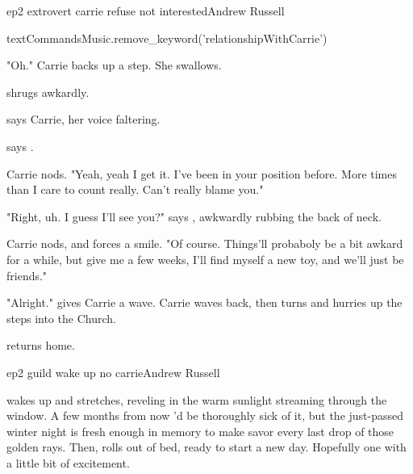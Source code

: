 \documentclass{book}
\begin{document}
\begin{childnode}{ep2 extrovert carrie refuse not interested}{Andrew Russell}


    \begin{code}

        textCommandsMusic.remove_keyword('relationshipWithCarrie')

    \end{code}

    "Oh." Carrie backs up a step. She swallows.
    
    \name{} shrugs awkardly.

     says Carrie, her voice faltering.

     says \name{}.

    Carrie nods. "Yeah, yeah I get it. I've been in your position before. More times than I care to count really. Can't really blame you."

    "Right, uh. I guess I'll see you?" says \name{}, awkwardly rubbing the back of \names{} neck.

    Carrie nods, and forces a smile. "Of course. Things'll probaboly be a bit awkard for a while, but give me a few weeks, I'll find myself a new toy, and we'll just be friends."

    "Alright." \name{} gives Carrie a wave. Carrie waves back, then turns and hurries up the steps into the Church.

    \name{} returns home.



\end{childnode}

\begin{childnode}{ep2 guild wake up no carrie}{Andrew Russell}

    \name{} wakes up and stretches, reveling in the warm sunlight streaming through the window. A few months from now \heshe{}'d be thoroughly sick of it, but the just-passed winter night is fresh enough in \hisher{} memory to make \himher{} savor every last drop
    of those golden rays.
    Then, \heshe{} rolls out of bed, ready to start a new day. Hopefully one with a little bit of excitement.

\end{childnode}
\end{document}
